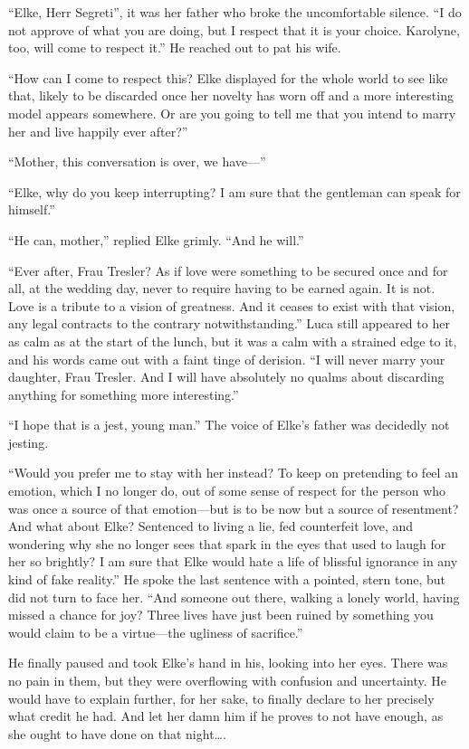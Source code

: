 ``Elke, Herr Segreti'', it was her father who broke the uncomfortable silence. ``I do not approve of what you are doing, but I respect that it is your choice. Karolyne, too, will come to respect it.'' He reached out to pat his wife.

``How can I come to respect this? Elke displayed for the whole world to see like that, likely to be discarded once her novelty has worn off and a more interesting model appears somewhere. Or are you going to tell me that you intend to marry her and live happily ever after?''

``Mother, this conversation is over, we have---''

``Elke, why do you keep interrupting? I am sure that the gentleman can speak for himself.''

``He can, mother,'' replied Elke grimly. ``And he will.''

``Ever after, Frau Tresler? As if love were something to be secured once and for all, at the wedding day, never to require having to be earned again. It is not. Love is a tribute to a vision of greatness. And it ceases to exist with that vision, any legal contracts to the contrary notwithstanding.'' Luca still appeared to her as calm as at the start of the lunch, but it was a calm with a strained edge to it, and his words came out with a faint tinge of derision. ``I will never marry your daughter, Frau Tresler. And I will have absolutely no qualms about discarding anything for something more interesting.''

``I hope that is a jest, young man.'' The voice of Elke's father was decidedly not jesting.

``Would you prefer me to stay with her instead? To keep on pretending to feel an emotion, which I no longer do, out of some sense of respect for the person who was once a source of that emotion---but is to be now but a source of resentment? And what about Elke? Sentenced to living a lie, fed counterfeit love, and wondering why she no longer sees that spark in the eyes that used to laugh for her so brightly? I am sure that Elke would hate a life of blissful ignorance in any kind of fake reality.'' He spoke the last sentence with a pointed, stern tone, but did not turn to face her. ``And someone out there, walking a lonely world, having missed a chance for joy? Three lives have just been ruined by something you would claim to be a virtue---the ugliness of sacrifice.''

He finally paused and took Elke's hand in his, looking into her eyes. There was no pain in them, but they were overflowing with confusion and uncertainty. He would have to explain further, for her sake, to finally declare to her precisely what credit he had. And let her damn him if he proves to not have enough, as she ought to have done on that night\ldots.

